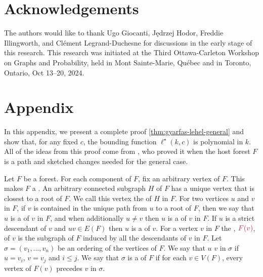 \documentclass{patmorin}
\newenvironment{dummy}{}
\newcommand{\gwen}[1]{\textcolor{Purple}{Gwen: #1}}
\begin{document}



\section*{Acknowledgements}
The authors would like to thank
Ugo Giocanti,
Jędrzej Hodor,
Freddie Illingworth, and
Clément Legrand-Duchesne
for discussions in the early stage of this research.
This research was initiated at the Third Ottawa-Carleton Workshop on Graphs and Probability, held in Mont Sainte-Marie, Québec and in Toronto, Ontario, Oct 13–20, 2024.





\section*{Appendix}

In this appendix, we present a complete proof \cref{thm:gyarfas-lehel-general} and show that, for any fixed $c$, the bounding function $\ell^\star(k,c)$ is polynomial in $k$.  All of the ideas from this proof come from \citet{gyarfas.lehel:helly}, who proved it when the host forest $F$ is a path and sketched changes needed for the general case.

Let $F$ be a forest.
For each component of $F$, fix an arbitrary vertex of $F$. This makes $F$ a .
An arbitrary connected subgraph $H$ of $F$ has a unique vertex that is closest to a root of $F$. We call this vertex the  of $H$ in $F$.
For two vertices $u$ and $v$ in $F$,
if $v$ is contained in the unique path from $u$ to a root of $F$, then we say that $u$ is a  of $v$ in $F$, and when additionally $u\neq v$  then $u$ is a  of $v$ in $F$.  If $u$ is a strict descendant of $v$ and $uv\in E(F)$ then $u$ is a  of $v$.
For a vertex $v$ in $F$ the , $\mathdefin{F(v)}$, of $v$ is the subgraph of $F$ induced by all the descendants of $v$ in $F$.
Let $\sigma=(v_1,\ldots,v_n)$ be an ordering of the vertices of $F$.
We say that $u$  $v$ in $\sigma$ if $u=v_i$, $v=v_j$ and $i\leq j$.
We say that $\sigma$ is a  of $F$ if for each $v\in V(F)$, every vertex of $F(v)$ precedes $v$ in $\sigma$.
\end{document}
